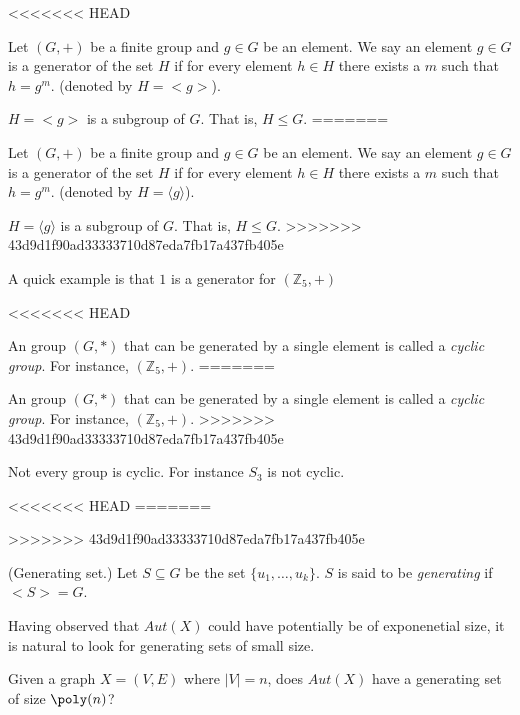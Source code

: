 <<<<<<< HEAD
\begin{definition}[Generator]
Let $(G,+)$ be a finite group and $g\in G$ be an element. We say an element $g\in G$ is a generator of the set $H$ if for every element $h\in H$ there exists a $m$ such that $h=g^m$.  (denoted by $H=<g>$).
\end{definition}

\begin{observation}$H = <g>$ is a subgroup of $G$. That is, $H\leq G$.
=======
\begin{definition}
Let $(G,+)$ be a finite group and $g\in G$ be an element. We say an element $g\in G$ is a generator of the set $H$ if for every element $h\in H$ there exists a $m$ such that $h=g^m$.  (denoted by $H=\langle g \rangle$).
\end{definition}

\begin{observation}$H = \langle g \rangle$ is a subgroup of $G$. That is, $H\leq G$.
>>>>>>> 43d9d1f90ad33333710d87eda7fb17a437fb405e
\end{observation}

A quick example is that $1$ is a generator for $(\mathbb{Z}_5,+)$

<<<<<<< HEAD

\begin{definition}An group $(G,*)$ that can be generated by a single element is called a {\em cyclic group}. For instance, $(\mathbb{Z}_5,+)$.
=======
\begin{definition}
An group $(G,*)$ that can be generated by a single element is called a {\em cyclic group}. For instance, $(\mathbb{Z}_5,+)$.
>>>>>>> 43d9d1f90ad33333710d87eda7fb17a437fb405e
\end{definition}

Not every group is cyclic. For instance $S_3$ is not cyclic.

<<<<<<< HEAD
=======

>>>>>>> 43d9d1f90ad33333710d87eda7fb17a437fb405e
\begin{definition}(Generating set.)
Let $S\subseteq G$ be the set $\{u_1,\ldots,u_k\}$. $S$ is said to be {\em generating} if $<S>=G$.  
\end{definition}

Having observed that $Aut(X)$ could have potentially be of exponenetial size, it is natural to look for generating sets of small size.

Given a graph $X=(V,E)$ where $|V|=n$, does $Aut(X)$ have a generating set of size $\poly(n)$?


\end{definition}
\end{observation}

